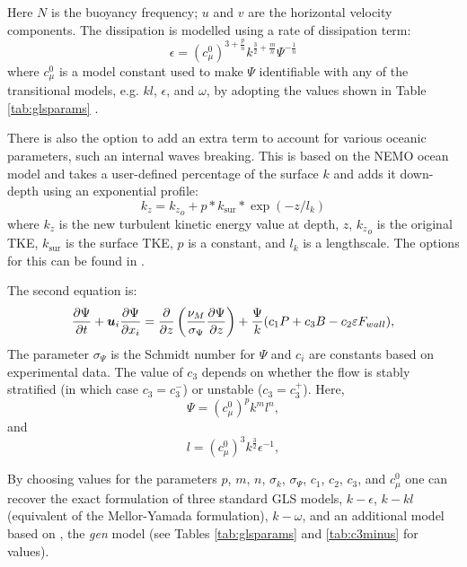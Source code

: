 Here $N$ is the buoyancy frequency; $u$ and $v$ are the horizontal velocity 
components. The dissipation is modelled using a rate of dissipation term:
\begin{equation}
\epsilon=\left(c_\mu^0\right)^{3+\frac{p}{n}}k^{\frac{3}{2}+\frac{m}{n}}\Psi^{-\frac{1}{n}}
\end{equation}
where $c_\mu^0$ is a model constant used to make $\Psi$ identifiable with any of the transitional
models, e.g. $kl$, $\epsilon$, and $\omega$, by adopting the values shown in Table \ref{tab:glsparams} \citep{umlauf2003}.

There is also the option to add an extra term to account for various
oceanic parameters, such an internal waves breaking. This is based on the NEMO
ocean model and takes a user-defined percentage of the surface $k$ and adds it down-depth
using an exponential profile:
\begin{equation}
    k_z = {k_z}_o + p*k_{\mathrm{sur}} * \exp{\left( -z / l_k \right)}
\end{equation}
where $k_z$ is the new turbulent kinetic energy value at depth, $z$, ${k_z}_o$ is the original TKE, $k_{\mathrm{sur}}$
is the surface TKE, $p$ is a constant, and $l_k$ is a lengthscale. The options for this can be found in
.

The second equation is:
\begin{equation}
\frac{\partial \Psi}{\partial t} + {\mbox{\boldmath$u$}}_i\frac{\partial \Psi}{\partial x_i} =
\frac{\partial}{\partial z}\left(\frac{\nu_M}{\sigma_\Psi}\frac{\partial \Psi}{\partial z}\right) +
\frac{\Psi}{k}(c_1P + c_3B - c_2\varepsilon F_{wall}),
\label{eq:psi_one}
\end{equation}
\noindent
The parameter $\sigma_\Psi$ is the Schmidt number for $\Psi$ and $c_i$ are
constants based on experimental data. The value of $c_3$ depends on whether the flow
is stably stratified (in which case $c_3=c_3^-$) or unstable ($c_3=c_3^+$).
Here,
\begin{equation}
\Psi=\left(c_\mu^0\right)^pk^ml^n,
\label{eq:psi}
\end{equation}
and
\begin{equation}
l=\left(c_\mu^0\right)^3k^{\frac{3}{2}}\epsilon^{-1},
\end{equation}

By choosing values for the parameters $p$, $m$, $n$, $\sigma_k$, $\sigma_\Psi$,
$c_1$, $c_2$, $c_3$, and $c_\mu^0$ one can recover the
exact formulation of three standard GLS models, $k-\epsilon$, $k-kl$ (equivalent of the Mellor-Yamada formulation),
$k-\omega$, and an additional model based on \citet{umlauf2003}, the \emph{gen}
model (see Tables \ref{tab:glsparams} and \ref{tab:c3minus} for values).

